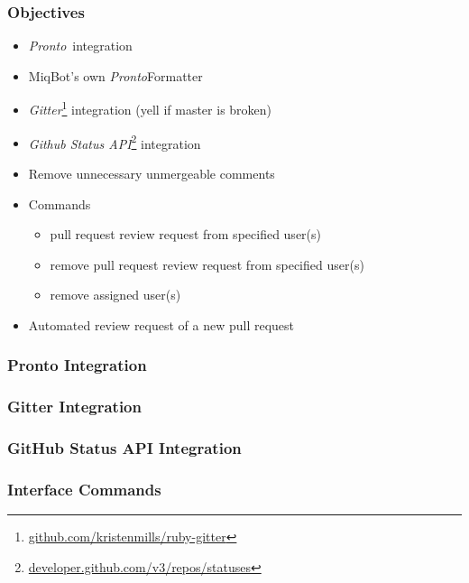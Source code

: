 \documentclass[10pt,xcolor=pdflatex]{beamer}
\begin{document}
\begin{frame}\frametitle{Objectives}
    \begin{itemize}
        \item \textit{Pronto}\footnotemark \ integration\\[0.5em]
        \item MiqBot's own \textit{Pronto}\footnotemark[\value{footnote}] Formatter\\[0.5em]


        \item \textit{Gitter}\footnote{\color{cyan}\href{https://github.com/kristenmills/ruby-gitter}{github.com/kristenmills/ruby-gitter}} integration (yell if master is broken)\\[0.5em]
        \item \textit{Github Status API}\footnote{\color{cyan}\href{https://developer.github.com/v3/repos/statuses}{developer.github.com/v3/repos/statuses}} integration\\[0.5em]
        \item Remove unnecessary unmergeable comments
        \item Commands\\
            \begin{itemize}
                \item pull request review request from specified user(s)
                \item remove pull request review request from specified user(s)
                \item remove assigned user(s)
            \end{itemize}
        \item Automated review request of a new pull request
    \end{itemize}
\end{frame}

\begin{frame}\frametitle{Pronto Integration}
\end{frame}

\begin{frame}\frametitle{Gitter Integration}
\end{frame}

\begin{frame}\frametitle{GitHub Status API Integration}
\end{frame}

\begin{frame}\frametitle{Interface Commands}
\end{frame}

\end{document}
